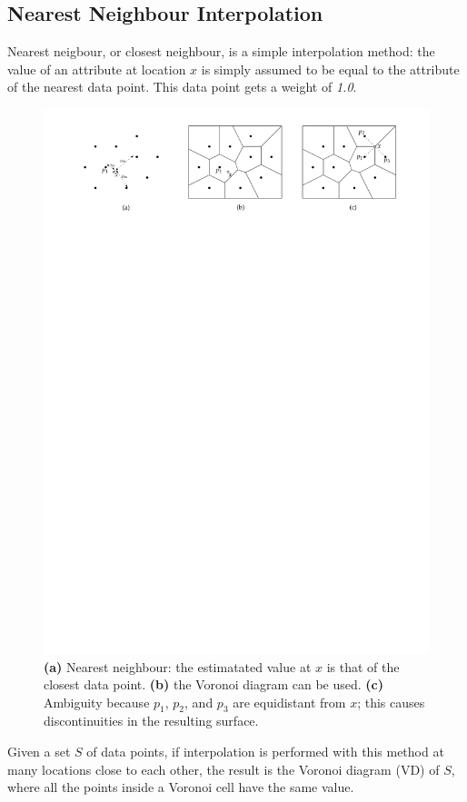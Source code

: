 \subsection{Nearest Neighbour Interpolation}

Nearest neigbour, or closest neighbour, is a simple interpolation method: the value of an attribute at location $x$ is simply assumed to be equal to the attribute of the nearest data point. 
This data point gets a weight of \emph{1.0}.
\begin{figure}[b]
  \centering
  \includegraphics[width=0.95\linewidth]{figs/cn}
  \caption{\textbf{(a)} Nearest neighbour: the estimatated value at $x$ is that of the closest data point. \textbf{(b)} the Voronoi diagram can be used. \textbf{(c)} Ambiguity because $p_1$, $p_2$, and $p_3$ are equidistant from $x$; this causes discontinuities in the resulting surface.}
\label{fig:nn}
\end{figure}
Given a set $S$ of data points, if interpolation is performed with this method at many locations close to each other, the result is the Voronoi diagram (VD) of $S$, where all the points inside a Voronoi cell have the same value.


